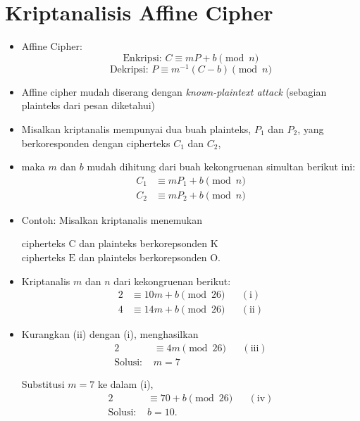 \documentclass{article}
\begin{document}
\newpage


\section*{Kriptanalisis Affine Cipher}

\begin{itemize}
    \item Affine Cipher:
    \[ \text{Enkripsi: } C \equiv mP + b \pmod{n} \]
    \[ \text{Dekripsi: } P \equiv m^{-1} (C - b) \pmod{n} \]
    
    \item Affine cipher mudah diserang dengan \textit{known-plaintext attack} (sebagian plainteks dari pesan diketahui)
    
    \item Misalkan kriptanalis mempunyai dua buah plainteks, $P_1$ dan $P_2$, yang berkoresponden dengan cipherteks $C_1$ dan $C_2$,
    
    \item maka $m$ dan $b$ mudah dihitung dari buah kekongruenan simultan berikut ini:
    \begin{align*}
        C_1 &\equiv mP_1 + b \pmod{n} \\
        C_2 &\equiv mP_2 + b \pmod{n}
    \end{align*}
\end{itemize}

\newpage


\begin{itemize}
    \item Contoh: Misalkan kriptanalis menemukan
    \begin{center}
        cipherteks $\text{C}$ dan plainteks berkorepsonden $\text{K}$ \\
        cipherteks $\text{E}$ dan plainteks berkorepsonden $\text{O}$.
    \end{center}

    \item Kriptanalis $m$ dan $n$ dari kekongruenan berikut:
    \begin{align}
        2 &\equiv 10m + b \pmod{26} && (\text{i}) \\
        4 &\equiv 14m + b \pmod{26} && (\text{ii})
    \end{align}

    \item Kurangkan (ii) dengan (i), menghasilkan
    \begin{align}
        2 &\equiv 4m \pmod{26} && (\text{iii}) \\
        \text{Solusi: } & m = 7
    \end{align}

    Substitusi $m = 7$ ke dalam (i),
    \begin{align}
        2 &\equiv 70 + b \pmod{26} && (\text{iv}) \\
        \text{Solusi: } & b = 10.
    \end{align}
\end{itemize}
\end{document}
